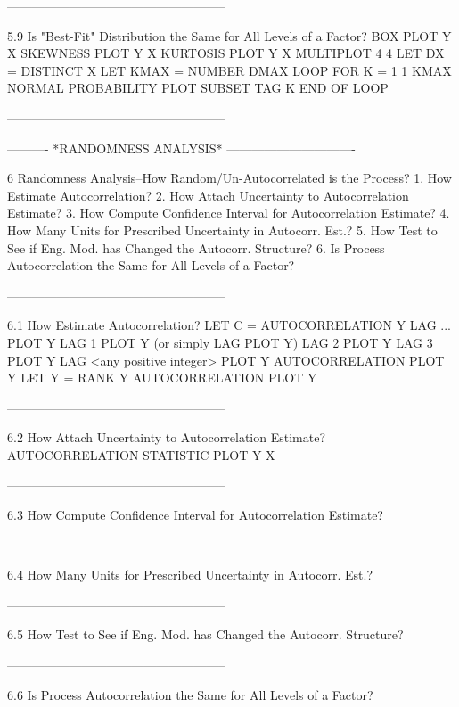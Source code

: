 -----------------------------------------------------
 
5.9
Is "Best-Fit" Distribution the Same for All Levels of a Factor?
      BOX PLOT Y X
      SKEWNESS PLOT Y X
      KURTOSIS PLOT Y X
      MULTIPLOT 4 4
      LET DX = DISTINCT X
      LET KMAX = NUMBER DMAX
      LOOP FOR K = 1 1 KMAX
      NORMAL PROBABILITY PLOT SUBSET TAG K
      END OF LOOP
 
-----------------------------------------------------
 
 
 
 
----------  *RANDOMNESS ANALYSIS*  -------------------------------
 
6
Randomness Analysis--How Random/Un-Autocorrelated is the Process?
   1. How Estimate Autocorrelation?
   2. How Attach Uncertainty to Autocorrelation Estimate?
   3. How Compute Confidence Interval for Autocorrelation Estimate?
   4. How Many Units for Prescribed Uncertainty in Autocorr. Est.?
   5. How Test to See if Eng. Mod. has Changed the Autocorr. Structure?
   6. Is Process Autocorrelation the Same for All Levels of a Factor?
 
-----------------------------------------------------
 
6.1
How Estimate Autocorrelation?
      LET C = AUTOCORRELATION Y
      LAG ... PLOT Y
         LAG 1 PLOT Y  (or simply LAG PLOT Y)
         LAG 2 PLOT Y
         LAG 3 PLOT Y
         LAG <any positive integer> PLOT Y
      AUTOCORRELATION PLOT Y
      LET Y = RANK Y
      AUTOCORRELATION PLOT Y
 
-----------------------------------------------------
 
6.2
How Attach Uncertainty to Autocorrelation Estimate?
      AUTOCORRELATION STATISTIC PLOT Y X
 
-----------------------------------------------------
 
6.3
How Compute Confidence Interval for Autocorrelation Estimate?
 
-----------------------------------------------------
 
6.4
How Many Units for Prescribed Uncertainty in Autocorr. Est.?
 
-----------------------------------------------------
 
6.5
How Test to See if Eng. Mod. has Changed the Autocorr. Structure?
 
-----------------------------------------------------
 
6.6
Is Process Autocorrelation the Same for All Levels of a Factor?
 
